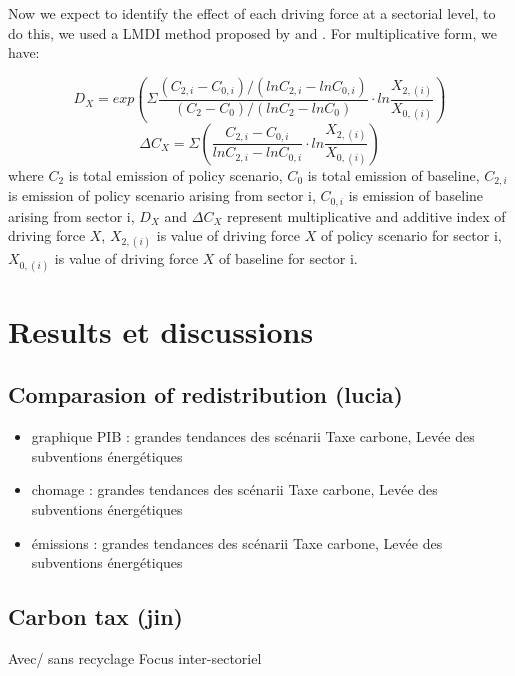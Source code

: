 \documentclass[
]{article}
\providecommand{\tightlist}{%
  \setlength{\itemsep}{0pt}\setlength{\parskip}{0pt}}
\begin{document}
Now we expect to identify the effect of each driving force at a
sectorial level, to do this, we used a LMDI method proposed by
\textcite{ang1997} and \textcite{ang2005}. For multiplicative form, we
have:

\[ D_{X} = exp ( \Sigma \frac{(C_{2,i}-C_{0,i})/(lnC_{2,i}-lnC_{0,i})}{(C_{2}-C_{0})/(lnC_{2}-lnC_{0})} \cdot ln \frac{X_{2,(i)}}{X_{0,(i)}} ) \tag{11}\]
\[ \Delta C_{X} =  \Sigma (\frac{C_{2,i}-C_{0,i}}{lnC_{2,i}-lnC_{0,i}} \cdot ln\frac{X_{2,(i)}}{X_{0,(i)}}) \tag{12} \]
where \(C_{2}\) is total emission of policy scenario, \(C_{0}\) is total
emission of baseline, \(C_{2,i}\) is emission of policy scenario arising
from sector i, \(C_{0,i}\) is emission of baseline arising from sector
i, \(D_{X}\) and \(\Delta C_{X}\) represent multiplicative and additive
index of driving force \(X\), \(X_{2,(i)}\) is value of driving force
\(X\) of policy scenario for sector i, \(X_{0,(i)}\) is value of driving
force \(X\) of baseline for sector i.

\hypertarget{results-et-discussions}{%
\section{Results et discussions}\label{results-et-discussions}}

\hypertarget{comparasion-of-redistribution-lucia}{%
\subsection{Comparasion of redistribution
(lucia)}\label{comparasion-of-redistribution-lucia}}

\begin{itemize}
\tightlist
\item
  graphique PIB : grandes tendances des scénarii Taxe carbone, Levée des
  subventions énergétiques
\item
  chomage : grandes tendances des scénarii Taxe carbone, Levée des
  subventions énergétiques
\item
  émissions : grandes tendances des scénarii Taxe carbone, Levée des
  subventions énergétiques
\end{itemize}

\hypertarget{carbon-tax-jin-1}{%
\subsection{Carbon tax (jin)}\label{carbon-tax-jin-1}}

Avec/ sans recyclage Focus inter-sectoriel
\end{document}
